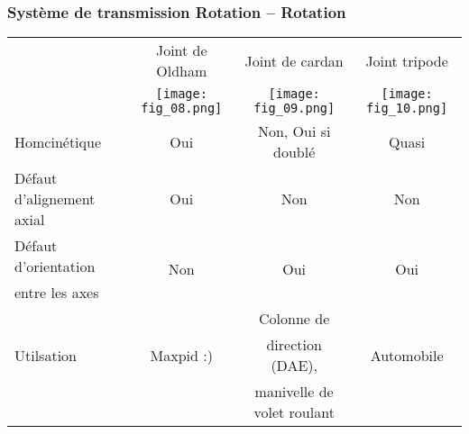 \subsubsection{Système de transmission Rotation -- Rotation}
\begin{table*}[!h]
\begin{tabular}{lccc}
\cline{2-4}
& Joint de Oldham & Joint de cardan & Joint tripode \\ \cline{2-4}
\cline{2-4}
&\texttt{[image: fig\_08.png]}&\texttt{[image: fig\_09.png]}& 
\texttt{[image: fig\_10.png]}\\ \hline
Homcinétique & Oui & Non, Oui si doublé & Quasi \\ %
Défaut d'alignement axial & Oui & Non & Non \\ %
Défaut d'orientation & \multirow{2}{*}{Non} &  \multirow{2}{*}{Oui}& \multirow{2}{*}{Oui} \\ 
entre les axes  & & & \\ %
 & & Colonne de & \\
Utilsation&Maxpid :) &  direction (DAE),  & Automobile \\
&&  manivelle de volet roulant & \\
\hline
\end{tabular}
\end{table*}
